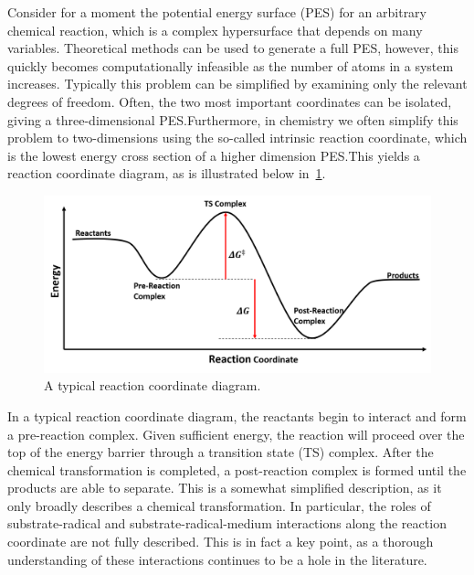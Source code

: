 Consider for a moment the potential energy surface (PES) for an arbitrary chemical reaction, which is a complex hypersurface that depends on many variables. Theoretical methods can be used to generate a full PES, however, this quickly becomes computationally infeasible as the number of atoms in a system increases. Typically this problem can be simplified by examining only the relevant degrees of freedom. Often, the two most important coordinates can be isolated, giving a three-dimensional PES.\@ Furthermore, in chemistry we often simplify this problem to two-dimensions using the so-called intrinsic reaction coordinate, which is the lowest energy cross section of a higher dimension PES.\@ This yields a reaction coordinate diagram, as is illustrated below in~\ref{fig:pes}.

\begin{figure}[htb]
  \centering
  \includegraphics[width=\textwidth]{figures/pes}
  \caption[A typical reaction coordinate diagram.]{A typical reaction coordinate diagram.}
\label{fig:pes}
\end{figure}

In a typical reaction coordinate diagram, the reactants begin to interact and form a pre-reaction complex. Given sufficient energy, the reaction will proceed over the top of the energy barrier through a transition state (TS) complex. After the chemical transformation is completed, a post-reaction complex is formed until the products are able to separate. This is a somewhat simplified description, as it only broadly describes a chemical transformation. In particular, the roles of substrate-radical and substrate-radical-medium interactions along the reaction coordinate are not fully described. This is in fact a key point, as a thorough understanding of these interactions continues to be a hole in the literature.

